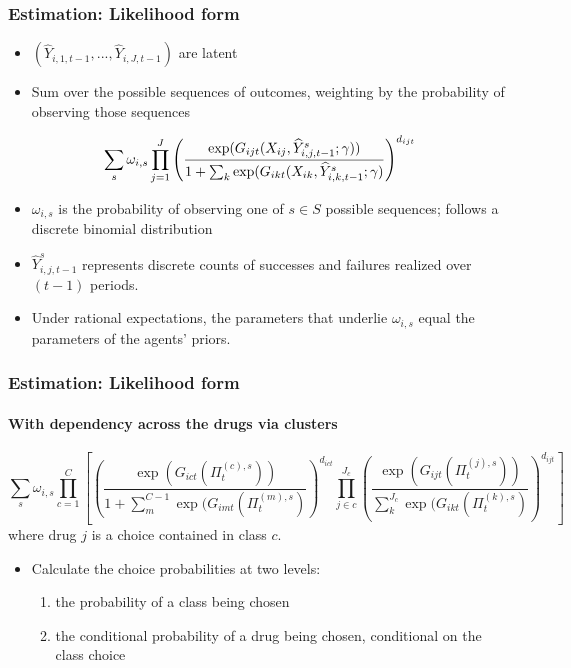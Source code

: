 \documentclass[xcolor=pdftex,dvipsnames,table,mathserif,aspectratio=169]{beamer}
\begin{document}
\begin{frame}
\frametitle{Estimation: Likelihood form}

\begin{itemize}
\item $(\widehat{Y}_{i,1,t-1},...,\widehat{Y}_{i,J,t-1})$ are latent

\item Sum over the possible sequences of outcomes, weighting by the
probability of observing those sequences
\end{itemize}

\[
\sum_{s}\omega_{i,s}\prod_{j=1}^{J}\left( \frac{\exp (G_{ijt}(X_{ij},%
\widehat{Y}^{s}_{i,j,t-1};\gamma ))}{1+\sum_{k}\exp (G_{ikt}(X_{ik},\widehat{%
Y}^{s}_{i,k,t-1};\gamma )}\right) ^{d_{ijt}}
\]

\begin{itemize}
\item $\omega_{i,s}$ is the probability of observing one of $s\in S$
possible sequences; follows a discrete binomial distribution

\item $\widehat{Y}^{s}_{i,j,t-1}$ represents discrete counts of successes
and failures realized over $(t-1)$ periods.

\item Under rational expectations, the parameters that underlie $\omega_{i,s}
$ equal the parameters of the agents' priors.
\end{itemize}

\hyperlink{RESULTS}{}
\end{frame}


\begin{frame}
\frametitle{Estimation: Likelihood form} \framesubtitle{With dependency
across the drugs via clusters}

{\footnotesize 
\[
\sum_{s}\omega_{i,s}\prod_{c=1}^{C}\left[\left( \frac{\exp (G_{ict}(\Pi
_{t}^{(c),s}))}{1+\sum_{m}^{C-1}\exp (G_{imt}(\Pi _{t}^{(m),s})}\right)
^{d_{ict}}\prod_{j\in c}^{J_{c}}\left( \frac{\exp (G_{ijt}(\Pi _{t}^{(j),s}))%
}{\sum_{k}^{J_{c}}\exp (G_{ikt}(\Pi _{t}^{(k),s})}\right) ^{d_{ijt}}\right]
\]
}{\normalsize where drug $j$ is a choice contained in class $c$. \bigskip }

\begin{itemize}
\item {\normalsize Calculate the choice probabilities at two levels: }

\begin{enumerate}
\item {\normalsize the probability of a class being chosen }

\item {\normalsize the conditional probability of a drug being chosen,
conditional on the class choice }
\end{enumerate}
\end{itemize}

{\normalsize \hyperlink{RESULTS}{} }
\end{frame}
\end{document}
